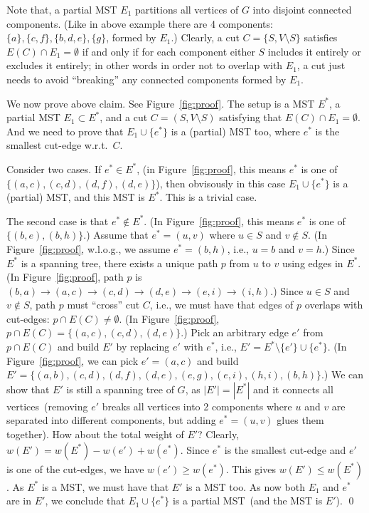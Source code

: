 \documentclass[letterpaper,11pt]{article}
\theoremstyle{mytheorem}
\begin{document}
Note that, a partial MST $E_1$ partitions all vertices of $G$ into disjoint connected components.
(Like in above example there are 4 components: $\{a\}, \{c,f\}, \{b,d,e\}, \{g\}$, formed by $E_1$.)
Clearly, a cut $C=\{S,V\setminus S\}$ satisfies $E(C) \cap E_1 = \emptyset$ if and only if for each component
either $S$ includes it entirely or excludes it entirely;
in other words in order not to overlap with $E_1$, a cut just needs to avoid ``breaking''
any connected components formed by $E_1$.

We now prove above claim.  See Figure~\ref{fig:proof}.
The setup is a MST $E^*$, a partial MST $E_1\subset E^*$,
and a cut $C = (S,V\setminus S)$ satisfying that $E(C)\cap E_1 = \emptyset$.
And we need to prove that $E_1\cup \{e^*\}$ is a (partial) MST too,
where $e^*$ is the smallest cut-edge w.r.t.\ $C$.

Consider two cases. If $e^* \in E^*$,
(in Figure~\ref{fig:proof}, this means $e^*$ is one of $\{(a,c),(c,d),(d,f),(d,e)\}$),
then obvisously in this case $E_1\cup \{e^*\}$ is a (partial) MST, and this MST is $E^*$.
This is a trivial case.

The second case is that $e^* \not\in E^*$.
(In Figure~\ref{fig:proof}, this means $e^*$ is one of $\{(b,e),(b,h)\}$.)
Assume that $e^* = (u,v)$ where $u\in S$ and $v\notin S$.
(In Figure~\ref{fig:proof}, w.l.o.g., we assume $e^* = (b,h)$, i.e., $u= b$ and $v=h$.)
Since $E^*$ is a spanning tree, there exists a unique path $p$ from $u$ to $v$ using edges in $E^*$.
(In Figure~\ref{fig:proof}, path $p$ is $(b,a)\to(a,c)\to(c,d)\to(d,e)\to(e,i)\to(i,h)$.)
Since $u\in S$ and $v\notin S$, path $p$ must ``cross'' cut $C$, i.e., 
we must have that edges of $p$ overlaps with cut-edges: $p\cap E(C)\neq \emptyset$.
(In Figure~\ref{fig:proof}, $p\cap E(C) = \{(a,c),(c,d),(d,e)\}$.)
Pick an arbitrary edge $e'$ from $p\cap E(C)$ and build
$E'$ by replacing $e'$ with $e^*$, i.e., $E' = E^* \setminus \{e'\} \cup \{e^*\}$.
(In Figure~\ref{fig:proof}, we can pick $e' = (a,c)$ and build $E' = \{(a,b),(c,d),(d,f),(d,e),(e,g),(e,i),(h,i),(b,h)\}$.)
We can show that $E'$ is still a spanning tree of $G$, as $|E'| = |E^*|$ and it connects all vertices~(removing $e'$ breaks
all vertices into 2 components where $u$ and $v$ are separated into different components, but adding $e^* = (u,v)$ glues them together).
How about the total weight of $E'$? Clearly, $w(E') = w(E^*) - w(e') + w(e^*)$.
Since $e^*$ is the smallest cut-edge and $e'$ is one of the cut-edges, we have $w(e') \ge w(e^*)$.
This gives $w(E') \le w(E^*)$. As $E^*$ is a MST, we must have that $E'$ is a MST too.
As now both $E_1$ and $e^*$ are in $E'$, we conclude that $E_1\cup \{e^*\}$ is a partial MST~(and the MST is $E'$). \qed
\end{document}
